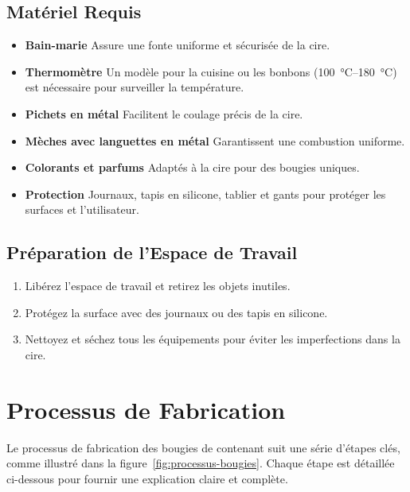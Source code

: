 \documentclass[11pt,fleqn,onecolumn,oneside]{book}
\begin{document}
\subsection*{Matériel Requis}
\begin{itemize}
    \item \textbf{Bain-marie} Assure une fonte uniforme et sécurisée de la cire.
    \item \textbf{Thermomètre} Un modèle pour la cuisine ou les bonbons (\SIrange{100}{180}{\degreeCelsius}) est nécessaire pour surveiller la température.
    \item \textbf{Pichets en métal} Facilitent le coulage précis de la cire.
    \item \textbf{Mèches avec languettes en métal} Garantissent une combustion uniforme.
    \item \textbf{Colorants et parfums} Adaptés à la cire pour des bougies uniques.
    \item \textbf{Protection} Journaux, tapis en silicone, tablier et gants pour protéger les surfaces et l’utilisateur.
\end{itemize}

\subsection*{Préparation de l’Espace de Travail}
\begin{enumerate}
    \item Libérez l’espace de travail et retirez les objets inutiles.
    \item Protégez la surface avec des journaux ou des tapis en silicone.
    \item Nettoyez et séchez tous les équipements pour éviter les imperfections dans la cire.
\end{enumerate}

\section{Processus de Fabrication}

Le processus de fabrication des bougies de contenant suit une série d'étapes clés, comme illustré dans la figure~\ref{fig:processus-bougies}. Chaque étape est détaillée ci-dessous pour fournir une explication claire et complète.
\end{document}

